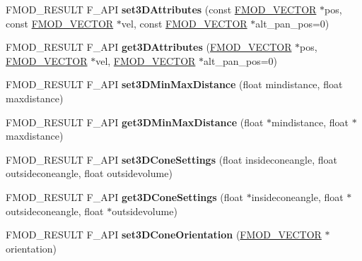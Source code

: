 \begin{DoxyCompactItemize}
F\+M\+O\+D\+\_\+\+R\+E\+S\+U\+LT F\+\_\+\+A\+PI {\bfseries set3\+D\+Attributes} (const \hyperlink{structFMOD__VECTOR}{F\+M\+O\+D\+\_\+\+V\+E\+C\+T\+OR} $\ast$pos, const \hyperlink{structFMOD__VECTOR}{F\+M\+O\+D\+\_\+\+V\+E\+C\+T\+OR} $\ast$vel, const \hyperlink{structFMOD__VECTOR}{F\+M\+O\+D\+\_\+\+V\+E\+C\+T\+OR} $\ast$alt\+\_\+pan\+\_\+pos=0)
\item 
\mbox{\label{classFMOD_1_1ChannelControl_ae889a0ccee9653108836bfaf8b5fcbbd}} 
F\+M\+O\+D\+\_\+\+R\+E\+S\+U\+LT F\+\_\+\+A\+PI {\bfseries get3\+D\+Attributes} (\hyperlink{structFMOD__VECTOR}{F\+M\+O\+D\+\_\+\+V\+E\+C\+T\+OR} $\ast$pos, \hyperlink{structFMOD__VECTOR}{F\+M\+O\+D\+\_\+\+V\+E\+C\+T\+OR} $\ast$vel, \hyperlink{structFMOD__VECTOR}{F\+M\+O\+D\+\_\+\+V\+E\+C\+T\+OR} $\ast$alt\+\_\+pan\+\_\+pos=0)
\item 
\mbox{\label{classFMOD_1_1ChannelControl_abdf3cebe9997771b6844819ee7eb85e9}} 
F\+M\+O\+D\+\_\+\+R\+E\+S\+U\+LT F\+\_\+\+A\+PI {\bfseries set3\+D\+Min\+Max\+Distance} (float mindistance, float maxdistance)
\item 
\mbox{\label{classFMOD_1_1ChannelControl_ab8dadcd83013ea4826bd8e44cb73ebc5}} 
F\+M\+O\+D\+\_\+\+R\+E\+S\+U\+LT F\+\_\+\+A\+PI {\bfseries get3\+D\+Min\+Max\+Distance} (float $\ast$mindistance, float $\ast$maxdistance)
\item 
\mbox{\label{classFMOD_1_1ChannelControl_ab65692317899c31d68e84cb1127840ff}} 
F\+M\+O\+D\+\_\+\+R\+E\+S\+U\+LT F\+\_\+\+A\+PI {\bfseries set3\+D\+Cone\+Settings} (float insideconeangle, float outsideconeangle, float outsidevolume)
\item 
\mbox{\label{classFMOD_1_1ChannelControl_a2189e119ad2569ffdc58396deb9f8967}} 
F\+M\+O\+D\+\_\+\+R\+E\+S\+U\+LT F\+\_\+\+A\+PI {\bfseries get3\+D\+Cone\+Settings} (float $\ast$insideconeangle, float $\ast$outsideconeangle, float $\ast$outsidevolume)
\item 
\mbox{\label{classFMOD_1_1ChannelControl_a593550467390c1786ca195d1092010b1}} 
F\+M\+O\+D\+\_\+\+R\+E\+S\+U\+LT F\+\_\+\+A\+PI {\bfseries set3\+D\+Cone\+Orientation} (\hyperlink{structFMOD__VECTOR}{F\+M\+O\+D\+\_\+\+V\+E\+C\+T\+OR} $\ast$orientation)

\end{DoxyCompactItemize}
